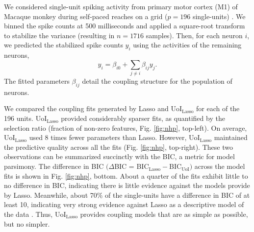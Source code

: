 \documentclass[letterpaper, 10 pt, conference]{ieeeconf}  %
\begin{document}
We considered single-unit spiking activity from primary motor cortex (M1) of Macaque monkey during self-paced reaches on a grid ($p=196$ single-units) \cite{nhp}. We binned the spike counts at 500 milliseconds and applied a square-root transform to stabilize the variance (resulting in $n=1716$ samples). Then, for each neuron $i$, we predicted the stabilized spike counts $y_i$ using the activities of the remaining neurons,
$$
y_i = \beta_{i0} + \sum_{j\neq i} \beta_{ij} y_j.
$$
The fitted parameters $\beta_{ij}$ detail the coupling structure for the population of neurons.

We compared the coupling fits generated by Lasso and UoI$_{\text{Lasso}}$ for each of the 196 units. UoI$_{\text{Lasso}}$ provided considerably sparser fits, as quantified by the selection ratio (fraction of non-zero features, Fig. \ref{fig:nhp}, top-left). On average, UoI$_{\text{Lasso}}$ used 8 times fewer parameters than Lasso. However, UoI$_{\text{Lasso}}$ maintained the predictive quality across all the fits (Fig. \ref{fig:nhp}, top-right). These two observations can be summarized succinctly with the BIC, a metric for model parsimony. The difference in BIC $(\Delta$BIC = BIC$_{\text{Lasso}}-$BIC$_{\text{UoI}})$ across the model fits is shown in Fig. \ref{fig:nhp}, bottom. About a quarter of the fits exhibit little to no difference in BIC, indicating there is little evidence against the models provide by Lasso.  Meanwhile, about 70\% of the single-units have a difference in BIC of at least 10, indicating very strong evidence against Lasso as a descriptive model of the data \cite{kass1995}. Thus, UoI$_{\text{Lasso}}$ provides coupling models that are as simple as possible, but no simpler. 
\end{document}
